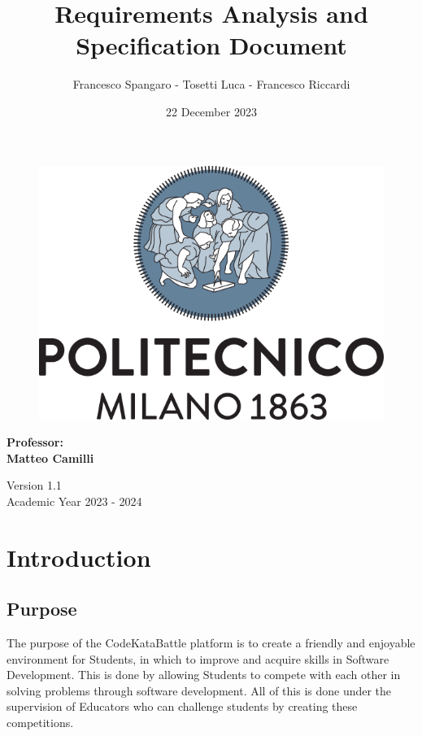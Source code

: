 \documentclass{article}
\title{\Huge{\textbf{Requirements Analysis and Specification Document}}}
\author{\Large{Francesco Spangaro - Tosetti Luca - Francesco Riccardi}}
\date{22 December 2023}
\begin{document}
\maketitle

\begin{figure}[h]
    \centering
    \includegraphics[scale=0.5]{politecnico-di-milano-logo.png}
\end{figure}

\vspace*{1cm}
\begin{center}
      \Large{\textbf{Professor:}} \\
      \Large{\textbf{Matteo Camilli}}
\end{center}
\vspace*{1cm}

\begin{center}
      \large{Version 1.1} \\
      \large{Academic Year 2023 - 2024}
\end{center}

\newpage

\tableofcontents

\newpage

\pagestyle{IntroductionStyle}

\section{Introduction}
\subsection{Purpose}
The purpose of the CodeKataBattle platform is to create a friendly and enjoyable environment for Students, in which
to improve and acquire skills in Software Development. 
This is done by allowing Students to compete with each other in solving problems through software development.
All of this is done under the supervision of Educators who can challenge students by creating these competitions.
\end{document}
